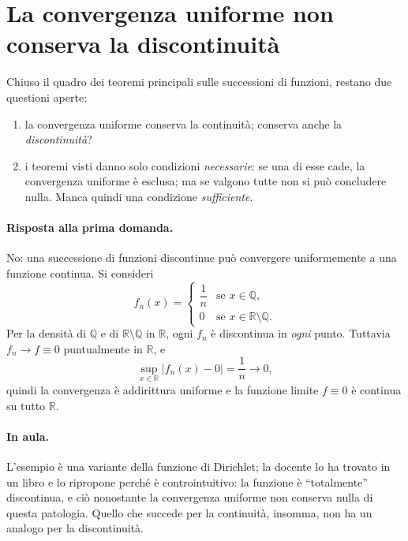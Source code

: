 
\section{La convergenza uniforme non conserva la discontinuità}

Chiuso il quadro dei teoremi principali sulle successioni di funzioni, restano due
questioni aperte:
\begin{enumerate}
  \item la convergenza uniforme conserva la continuità; conserva anche la
        \emph{discontinuità}?
  \item i teoremi visti danno solo condizioni \emph{necessarie}: se una di esse cade, la
        convergenza uniforme è esclusa; ma se valgono tutte non si può concludere nulla.
        Manca quindi una condizione \emph{sufficiente}.
\end{enumerate}

\paragraph{Risposta alla prima domanda.} No: una successione di funzioni discontinue può
convergere uniformemente a una funzione continua. Si consideri
\begin{equation}
f_n(x)=\begin{cases}
\dfrac{1}{n} & \text{se } x\in\mathbb{Q},\\[2mm]
0 & \text{se } x\in\mathbb{R}\setminus\mathbb{Q}.
\end{cases}
\end{equation}
Per la densità di $\mathbb{Q}$ e di $\mathbb{R}\setminus\mathbb{Q}$ in $\mathbb{R}$, ogni
$f_n$ è discontinua in \emph{ogni} punto. Tuttavia $f_n\to f\equiv 0$ puntualmente in
$\mathbb{R}$, e
\[
\sup_{x\in\mathbb{R}}|f_n(x)-0|=\frac{1}{n}\longrightarrow 0,
\]
quindi la convergenza è addirittura uniforme e la funzione limite $f\equiv0$ è continua su
tutto $\mathbb{R}$.

\paragraph{In aula.} L'esempio è una variante della funzione di Dirichlet; la docente lo
ha trovato in un libro e lo ripropone perché è controintuitivo: la funzione è
``totalmente'' discontinua, e ciò nonostante la convergenza uniforme non conserva nulla di
questa patologia. Quello che succede per la continuità, insomma, non ha un analogo per la
discontinuità.

